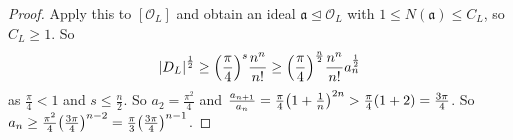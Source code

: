 \begin{proof}
    Apply this to \( [\mathcal O_L] \) and obtain an ideal \( \mathfrak a \trianglelefteq \mathcal O_L \) with \( 1 \leq N(\mathfrak a) \leq C_L \), so \( C_L \geq 1 \).
    So
    \[ \abs{D_L}^{\frac{1}{2}} \geq \qty(\frac{\pi}{4})^s \frac{n^n}{n!} \geq \qty(\frac{\pi}{4})^{\frac{n}{2}} \frac{n^n}{n!} a_n^{\frac{1}{2}} \]
    as \( \frac{\pi}{4} < 1 \) and \( s \leq \frac{n}{2} \).
    So \( a_2 = \frac{\pi^2}{4} \) and \( \frac{a_{n+1}}{a_n} = \frac{\pi}{4} \qty(1 + \frac{1}{n})^{2n} > \frac{\pi}{4}(1 + 2) = \frac{3\pi}{4} \).
    So \( a_n \geq \frac{\pi^2}{4} \qty(\frac{3\pi}{4})^{n-2} = \frac{\pi}{3} \qty(\frac{3\pi}{4})^{n-1} \).
\end{proof}
